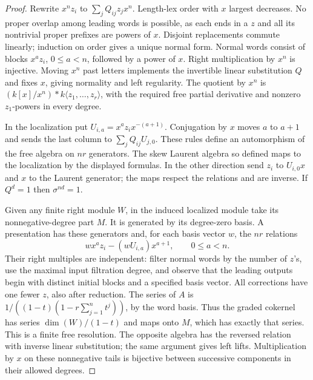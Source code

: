 \documentclass[11pt]{article}
\begin{document}
\begin{proof}
Rewrite $x^n z_i$ to $\sum_j Q_{ij}z_jx^n$. Length-lex order with $x$
largest decreases. No proper overlap among leading words is possible,
as each ends in a $z$ and all its nontrivial proper prefixes are powers
of $x$. Disjoint replacements commute linearly; induction on order
gives a unique normal form. Normal words consist of blocks $x^a z_i$,
$0\le a<n$, followed by a power of $x$. Right multiplication by $x^n$
is injective. Moving $x^n$ past letters implements the invertible
linear substitution $Q$ and fixes $x$, giving normality and left
regularity. The quotient by $x^n$ is $(k[x]/x^n)*k\langle z_1,\ldots,z_r
\rangle$, with the required free partial derivative and nonzero
$z_1$-powers in every degree.

In the localization put $U_{i,a}=x^a z_i x^{-(a+1)}$.
Conjugation by $x$ moves $a$ to $a+1$ and sends the last column to
$\sum_j Q_{ij}U_{j,0}$. These rules define an automorphism of the free
algebra on $nr$ generators. The skew Laurent algebra so defined maps
to the localization by the displayed formulas. In the other direction
send $z_i$ to $U_{i,0}x$ and $x$ to the Laurent generator; the maps
respect the relations and are inverse. If $Q^d=1$ then $\sigma^{nd}=1$.

Given any finite right module $W$, in the induced localized module
take its nonnegative-degree part $M$. It is generated by its degree-zero
basis. A presentation has these generators and, for each basis vector
$w$, the $nr$ relations
\[
         w x^a z_i-(wU_{i,a})x^{a+1},\qquad 0\le a<n .
\]
Their right multiples are independent: filter normal words by the number
of $z$'s, use the maximal input filtration degree, and observe that the
leading outputs begin with distinct initial blocks and a specified basis
vector. All corrections have one fewer $z$, also after reduction. The
series of $A$ is $1/((1-t)(1-r\sum_{j=1}^n t^j))$, by the word basis.
Thus the graded cokernel has series $\dim(W)/(1-t)$ and maps onto
$M$, which has exactly that series. This is a finite free resolution.
The opposite algebra has the reversed relation with inverse linear
substitution; the same argument gives left lifts. Multiplication by
$x$ on these nonnegative tails is bijective between successive
components in their allowed degrees.


\end{proof}
\end{document}
